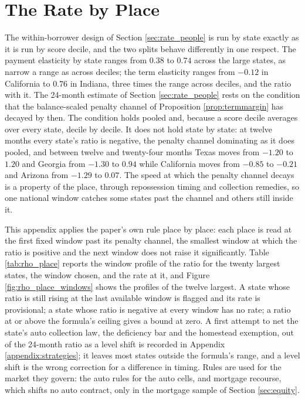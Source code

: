 \section{The Rate by Place}\label{appendix:place}

The within-borrower design of Section \ref{sec:rate_people} is run by state exactly as it is run by score decile, and the two splits behave differently in one respect. The payment elasticity by state ranges from $0.38$ to $0.74$ across the large states, as narrow a range as across deciles; the term elasticity ranges from $-0.12$ in California to $0.76$ in Indiana, three times the range across deciles, and the ratio with it. The 24-month estimate of Section \ref{sec:rate_people} rests on the condition that the balance-scaled penalty channel of Proposition \ref{prop:termmargin} has decayed by then. The condition holds pooled and, because a score decile averages over every state, decile by decile. It does not hold state by state: at twelve months every state's ratio is negative, the penalty channel dominating as it does pooled, and between twelve and twenty-four months Texas moves from $-1.20$ to $1.20$ and Georgia from $-1.30$ to $0.94$ while California moves from $-0.85$ to $-0.21$ and Arizona from $-1.29$ to $0.07$. The speed at which the penalty channel decays is a property of the place, through repossession timing and collection remedies, so one national window catches some states past the channel and others still inside it.

This appendix applies the paper's own rule place by place: each place is read at the first fixed window past its penalty channel, the smallest window at which the ratio is positive and the next window does not raise it significantly. Table \ref{tab:rho_place} reports the window profile of the ratio for the twenty largest states, the window chosen, and the rate at it, and Figure \ref{fig:rho_place_windows} shows the profiles of the twelve largest. A state whose ratio is still rising at the last available window is flagged and its rate is provisional; a state whose ratio is negative at every window has no rate; a ratio at or above the formula's ceiling gives a bound at zero. A first attempt to net the state's auto collection law, the deficiency bar and the homestead exemption, out of the 24-month ratio as a level shift is recorded in Appendix \ref{appendix:strategies}; it leaves most states outside the formula's range, and a level shift is the wrong correction for a difference in timing. Rules are used for the market they govern: the auto rules for the auto cells, and mortgage recourse, which shifts no auto contract, only in the mortgage sample of Section \ref{sec:equity}.

